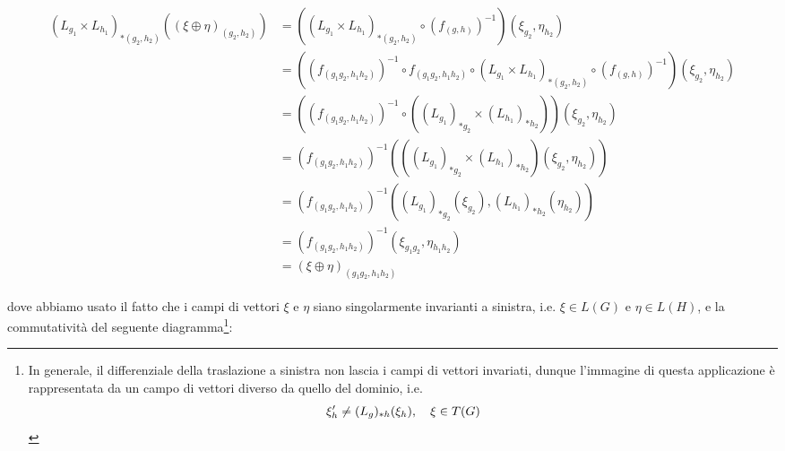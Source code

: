 {\begin{align}
	\begin{split}
		(L_{g_{1}} \times L_{h_{1}})_{*(g_{2},h_{2})} \left( (\xi \oplus \eta)_{(g_{2},h_{2})} \right) &= \left( (L_{g_{1}} \times L_{h_{1}})_{*(g_{2},h_{2})} \circ (f_{(g,h)})^{-1} \right) \left( \xi_{g_{2}}, \eta_{h_{2}} \right) \\
		&= \left( (f_{(g_{1} g_{2}, h_{1} h_{2})})^{-1} \circ f_{(g_{1} g_{2}, h_{1} h_{2})} \circ (L_{g_{1}} \times L_{h_{1}})_{*(g_{2},h_{2})} \circ (f_{(g,h)})^{-1} \right) \left( \xi_{g_{2}}, \eta_{h_{2}} \right) \\
		&= \left( (f_{(g_{1} g_{2}, h_{1} h_{2})})^{-1} \circ \left( (L_{g_{1}})_{*g_{2}} \times (L_{h_{1}})_{*h_{2}} \right) \right) \left( \xi_{g_{2}}, \eta_{h_{2}} \right) \\
		&= (f_{(g_{1} g_{2}, h_{1} h_{2})})^{-1} \left( \left( (L_{g_{1}})_{*g_{2}} \times (L_{h_{1}})_{*h_{2}} \right) \left( \xi_{g_{2}}, \eta_{h_{2}} \right) \right) \\
		&= (f_{(g_{1} g_{2}, h_{1} h_{2})})^{-1} \left( (L_{g_{1}})_{*g_{2}} (\xi_{g_{2}}), (L_{h_{1}})_{*h_{2}} (\eta_{h_{2}}) \right) \\
		&= (f_{(g_{1} g_{2}, h_{1} h_{2})})^{-1} \left( \xi_{g_{1} g_{2}}, \eta_{h_{1} h_{2}} \right) \\
		&= (\xi \oplus \eta)_{(g_{1} g_{2}, h_{1} h_{2})}
	\end{split}
\end{align}

dove abbiamo usato il fatto che i campi di vettori $ \xi $ e $ \eta $ siano singolarmente invarianti a sinistra, i.e. $ \xi \in L(G) $ e $ \eta \in L(H) $, e la commutatività del seguente diagramma\footnote{%
	In generale, il differenziale della traslazione a sinistra non lascia i campi di vettori invariati, dunque l'immagine di questa applicazione è rappresentata da un campo di vettori diverso da quello del dominio, i.e.
	\begin{equation*}
		\xi'_{h} \neq (L_{g})_{*h}(\xi_{h}) \qcomma \xi \in T(G)
	\end{equation*}%
}:


}
